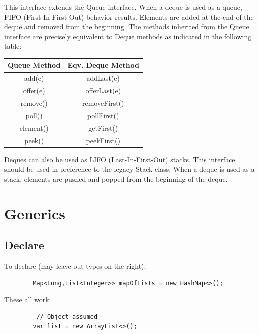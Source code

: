 \documentclass{scrartcl}
\begin{document}
    \bigskip
    \bigskip

    This interface extends the Queue interface. When a deque is used as a queue, FIFO (First-In-First-Out) behavior results. Elements are added at the end of the deque and removed from the beginning. The methods inherited from the Queue interface are precisely equivalent to Deque methods as indicated in the following table:

    \bigskip

    \begin{tabular}{|c|c|}
        \hline
        Queue Method& Eqv. Deque Method \\
        \hline
        add(e) &	addLast(e)  \\
        \hline
        offer(e) &	offerLast(e)  \\
        \hline
        remove() & 	removeFirst() \\
        \hline
        poll() &	pollFirst()  \\
        \hline
        element() &	getFirst()  \\
        \hline
        peek() &	peekFirst()  \\
        \hline
    \end{tabular}

    \bigskip

    Deques can also be used as LIFO (Last-In-First-Out) stacks. This interface should be used in preference to the legacy Stack class. When a deque is used as a stack, elements are pushed and popped from the beginning of the deque.


\section{Generics}
\subsection{Declare}

     To declare (may leave out types on the right):

    \begin{lstlisting}
        Map<Long,List<Integer>> mapOfLists = new HashMap<>();
    \end{lstlisting}

    These all work:

    \begin{lstlisting}
         // Object assumed
        var list = new ArrayList<>();
    \end{lstlisting}
\end{document}
